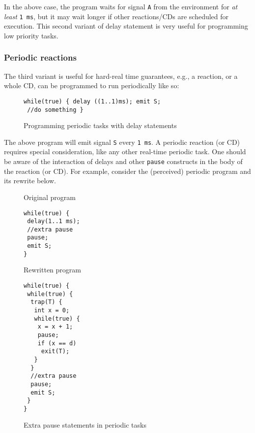 In the above case, the program waits for signal \texttt{A} from the
environment for \textit{at least} \texttt{1 ms}, but it may wait longer
if other reactions/CDs are scheduled for execution. This second variant
of delay statement is very useful for programming low priority tasks.

\subsubsection{Periodic reactions}
\label{sec:periodic-reactions}

The third variant is useful for hard-real time guarantees, e.g., a
reaction, or a whole CD, can be programmed to run periodically like so:

\begin{figure}[h!]
  \centering
	\vspace{-10pt}
		\begin{lstlisting}[style=sysj,basicstyle=\normalsize\ttfamily,morekeywords={emit,trap,pause,exit,delay}]
while(true) { delay ((1..1)ms); emit S; 
 //do something }
 \end{lstlisting}
  \caption{Programming periodic tasks with delay statements}
  \label{fig:periodic}
	\vspace{-10pt}
\end{figure}

The above program will emit signal \texttt{S} every \texttt{1 ms}. A
periodic reaction (or CD) requires special consideration, like any other
real-time periodic task. One should be aware of the interaction of
delays and other \texttt{pause} constructs in the body of the reaction
(or CD). For example, consider the (perceived) periodic program and its
rewrite below.

\begin{figure}[h!]
  \centering
  \begin{SubFloat}{\label{pp:a}Original program}
    \centering
			\begin{lstlisting}[style=sysj,basicstyle=\normalsize\ttfamily,morekeywords={emit,trap,pause,exit,delay}]
while(true) {
 delay(1..1 ms);
 //extra pause
 pause;
 emit S;
}
\end{lstlisting}
\end{SubFloat}
\hspace{9pt}
  \begin{SubFloat}{\label{pp:b}Rewritten program}
			\begin{lstlisting}[style=sysj,basicstyle=\normalsize\ttfamily,morekeywords={emit,trap,pause,exit,delay}]
while(true) {
 while(true) { 
  trap(T) {
   int x = 0;
   while(true) {
    x = x + 1;
    pause;
    if (x == d)
     exit(T);
   }
  }
  //extra pause
  pause;
  emit S;
 }
}
\end{lstlisting}
  \end{SubFloat}
\caption{Extra pause statements in periodic tasks}
  \label{fig:periodic2}
\end{figure}

